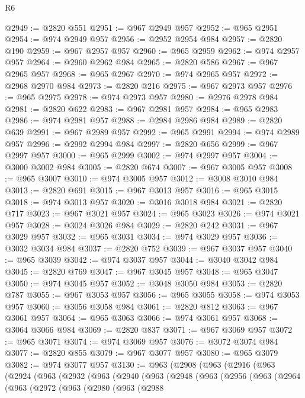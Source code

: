 \begin{lexlean}{R6}
\begin{coremodule}
@2949 := @2820 @551
@2951 := @967 @2949 @957
@2952 := @965 @2951
@2954 := @974 @2949 @957
@2956 := @2952 @2954 @984
@2957 := @2820 @190
@2959 := @967 @2957 @957
@2960 := @965 @2959
@2962 := @974 @2957 @957
@2964 := @2960 @2962 @984
@2965 := @2820 @586
@2967 := @967 @2965 @957
@2968 := @965 @2967
@2970 := @974 @2965 @957
@2972 := @2968 @2970 @984
@2973 := @2820 @216
@2975 := @967 @2973 @957
@2976 := @965 @2975
@2978 := @974 @2973 @957
@2980 := @2976 @2978 @984
@2981 := @2820 @622
@2983 := @967 @2981 @957
@2984 := @965 @2983
@2986 := @974 @2981 @957
@2988 := @2984 @2986 @984
@2989 := @2820 @639
@2991 := @967 @2989 @957
@2992 := @965 @2991
@2994 := @974 @2989 @957
@2996 := @2992 @2994 @984
@2997 := @2820 @656
@2999 := @967 @2997 @957
@3000 := @965 @2999
@3002 := @974 @2997 @957
@3004 := @3000 @3002 @984
@3005 := @2820 @674
@3007 := @967 @3005 @957
@3008 := @965 @3007
@3010 := @974 @3005 @957
@3012 := @3008 @3010 @984
@3013 := @2820 @691
@3015 := @967 @3013 @957
@3016 := @965 @3015
@3018 := @974 @3013 @957
@3020 := @3016 @3018 @984
@3021 := @2820 @717
@3023 := @967 @3021 @957
@3024 := @965 @3023
@3026 := @974 @3021 @957
@3028 := @3024 @3026 @984
@3029 := @2820 @242
@3031 := @967 @3029 @957
@3032 := @965 @3031
@3034 := @974 @3029 @957
@3036 := @3032 @3034 @984
@3037 := @2820 @752
@3039 := @967 @3037 @957
@3040 := @965 @3039
@3042 := @974 @3037 @957
@3044 := @3040 @3042 @984
@3045 := @2820 @769
@3047 := @967 @3045 @957
@3048 := @965 @3047
@3050 := @974 @3045 @957
@3052 := @3048 @3050 @984
@3053 := @2820 @787
@3055 := @967 @3053 @957
@3056 := @965 @3055
@3058 := @974 @3053 @957
@3060 := @3056 @3058 @984
@3061 := @2820 @812
@3063 := @967 @3061 @957
@3064 := @965 @3063
@3066 := @974 @3061 @957
@3068 := @3064 @3066 @984
@3069 := @2820 @837
@3071 := @967 @3069 @957
@3072 := @965 @3071
@3074 := @974 @3069 @957
@3076 := @3072 @3074 @984
@3077 := @2820 @855
@3079 := @967 @3077 @957
@3080 := @965 @3079
@3082 := @974 @3077 @957
@3130 := @963
    (@2908
      (@963
        (@2916
          (@963
            (@2924
              (@963
                (@2932
                  (@963
                    (@2940
                      (@963
                        (@2948
                          (@963
                            (@2956
                              (@963
                                (@2964
                                  (@963
                                    (@2972
                                      (@963
                                        (@2980
                                          (@963
                                            (@2988

\end{coremodule}
\end{lexlean}
